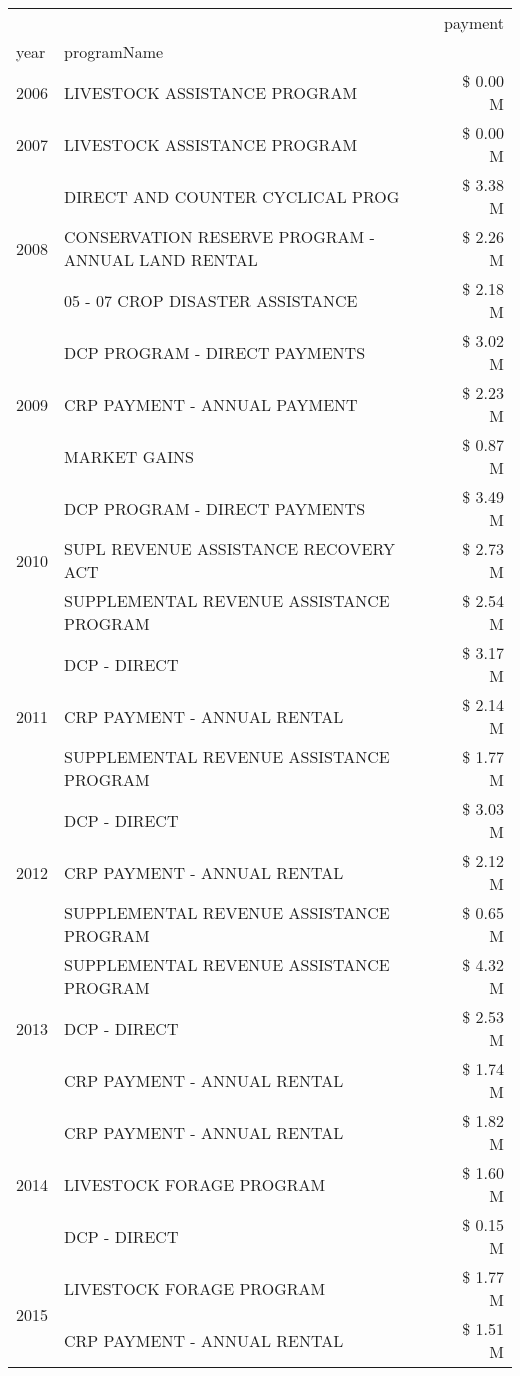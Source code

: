 \begin{tabular}{llr}
\toprule
 &  & payment \\
year & programName &  \\
\midrule
2006 & LIVESTOCK ASSISTANCE PROGRAM & \$ 0.00 M \\
\cline{1-3}
2007 & LIVESTOCK ASSISTANCE PROGRAM & \$ 0.00 M \\
\cline{1-3}
\multirow[t]{3}{*}{2008} & DIRECT AND COUNTER CYCLICAL PROG & \$ 3.38 M \\
 & CONSERVATION RESERVE PROGRAM - ANNUAL LAND RENTAL & \$ 2.26 M \\
 & 05 - 07 CROP DISASTER ASSISTANCE & \$ 2.18 M \\
\cline{1-3}
\multirow[t]{3}{*}{2009} & DCP PROGRAM - DIRECT PAYMENTS & \$ 3.02 M \\
 & CRP PAYMENT - ANNUAL PAYMENT & \$ 2.23 M \\
 & MARKET GAINS & \$ 0.87 M \\
\cline{1-3}
\multirow[t]{3}{*}{2010} & DCP PROGRAM - DIRECT PAYMENTS & \$ 3.49 M \\
 & SUPL REVENUE ASSISTANCE RECOVERY ACT & \$ 2.73 M \\
 & SUPPLEMENTAL REVENUE ASSISTANCE PROGRAM & \$ 2.54 M \\
\cline{1-3}
\multirow[t]{3}{*}{2011} & DCP - DIRECT & \$ 3.17 M \\
 & CRP PAYMENT - ANNUAL RENTAL & \$ 2.14 M \\
 & SUPPLEMENTAL REVENUE ASSISTANCE PROGRAM & \$ 1.77 M \\
\cline{1-3}
\multirow[t]{3}{*}{2012} & DCP - DIRECT & \$ 3.03 M \\
 & CRP PAYMENT - ANNUAL RENTAL & \$ 2.12 M \\
 & SUPPLEMENTAL REVENUE ASSISTANCE PROGRAM & \$ 0.65 M \\
\cline{1-3}
\multirow[t]{3}{*}{2013} & SUPPLEMENTAL REVENUE ASSISTANCE PROGRAM & \$ 4.32 M \\
 & DCP - DIRECT & \$ 2.53 M \\
 & CRP PAYMENT - ANNUAL RENTAL & \$ 1.74 M \\
\cline{1-3}
\multirow[t]{3}{*}{2014} & CRP PAYMENT - ANNUAL RENTAL & \$ 1.82 M \\
 & LIVESTOCK FORAGE PROGRAM & \$ 1.60 M \\
 & DCP - DIRECT & \$ 0.15 M \\
\cline{1-3}
\multirow[t]{3}{*}{2015} & LIVESTOCK FORAGE PROGRAM & \$ 1.77 M \\
 & CRP PAYMENT - ANNUAL RENTAL & \$ 1.51 M \\

\end{tabular}
